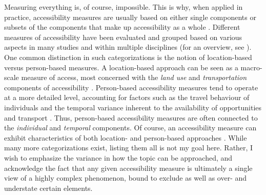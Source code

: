 Measuring everything is, of course, impossible.
This is why, when applied in practice, accessibility measures
are usually based on either single components
or subsets of the components that make up accessibility as a whole \parencite{geu2004}.
Different measures of accessibility have been
evaluated and grouped based on various aspects
in many studies and within multiple disciplines
(for an overview, see \textcite{wu2020}).
One common distinction in such categorizations
is the notion of location-based versus person-based measures.
A location-based approach can be seen as a macro-scale measure of access,
most concerned with the \textit{land use} and \textit{transportation}
components of accessibility \parencite{geu2004}.
Person-based accessibility measures tend to operate at a more detailed level,
accounting for factors such as the travel behaviour of individuals and
the temporal variance inherent to the availability of
opportunities and transport \parencite{neu2012, neu2011, kwa1998, kwa2003}.
Thus, person-based accessibility measures are often connected to
the \textit{individual} and \textit{temporal} components.
Of course, an accessibility measure can exhibit characteristics of
both location- and person-based approaches \parencite{jar2018}.  %
While many more categorizations exist, listing them all is not my goal here.
Rather, I wish to emphasize the variance in how the topic can be approached,
and acknowledge the fact that any given accessibility measure is ultimately
a single view of a highly complex phenomenon,
bound to exclude as well as over- and understate certain elements.





